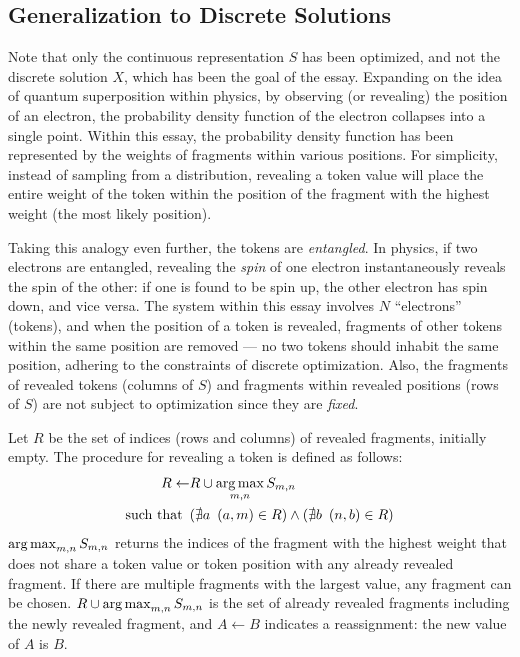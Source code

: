 \subsection{Generalization to Discrete Solutions}%
\label{sub:generalization_to_discrete_solutions}
Note that only the continuous representation $S$ has been optimized, and not the discrete solution $X$, which has been the goal of the essay. Expanding on the idea of quantum superposition within physics, by observing (or revealing) the position of an electron, the probability density function of the electron collapses into a single point. Within this essay, the probability density function has been represented by the weights of fragments within various positions. For simplicity, instead of sampling from a distribution, revealing a token value will place the entire weight of the token within the position of the fragment with the highest weight (the most likely position).

Taking this analogy even further, the tokens are \emph{entangled}. In physics, if two electrons are entangled, revealing the \emph{spin} of one electron instantaneously reveals the spin of the other: if one is found to be spin up, the other electron has spin down, and vice versa. The system within this essay involves $N$  ``electrons'' (tokens), and when the position of a token is revealed, fragments of other tokens within the same position are removed --- no two tokens should inhabit the same position, adhering to the constraints of discrete optimization. Also, the fragments of revealed tokens (columns of $S$) and fragments within revealed positions (rows of $S$) are not subject to optimization since they are \emph{fixed}.

Let $R$ be the set of indices (rows and columns) of revealed fragments, initially empty. The procedure for revealing a token is defined as follows:
\begin{align}
    R\leftarrow &R\cup \operatorname*{arg\,max}_{m,n}S_{m,n}\nonumber\\
    \text{such that}\enspace &(\nexists a\enspace (a,m)\in R) \land (\nexists b\enspace (n,b)\in R)
    \label{eq:reveal_token}
\end{align}
$\operatorname*{arg\,max}_{m,n}S_{m,n}$ returns the indices of the fragment with the highest weight that does not share a token value or token position with any already revealed fragment. If there are multiple fragments with the largest value, any fragment can be chosen. $R\cup \operatorname*{arg\,max}_{m,n}S_{m,n}$ is the set of already revealed fragments including the newly revealed fragment, and $A\leftarrow B$ indicates a reassignment: the new value of $A$ is $B$.

